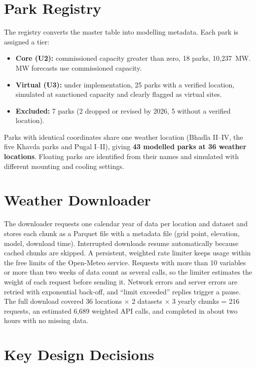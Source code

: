 \documentclass[12pt]{report}
\begin{document}
\section{Park Registry}
\vspace{1mm}
The registry converts the master table into modelling metadata. Each park is assigned a tier:
\begin{itemize}[noitemsep]
    \item \textbf{Core (U2):} commissioned capacity greater than zero, 18 parks, 10,237~MW. MW forecasts use commissioned capacity.
    \item \textbf{Virtual (U3):} under implementation, 25 parks with a verified location, simulated at sanctioned capacity and clearly flagged as virtual sites.
    \item \textbf{Excluded:} 7 parks (2 dropped or revised by 2026, 5 without a verified location).
\end{itemize}
Parks with identical coordinates share one weather location (Bhadla II--IV, the five Khavda parks and Pugal I--II), giving \textbf{43 modelled parks at 36 weather locations}. Floating parks are identified from their names and simulated with different mounting and cooling settings.

\section{Weather Downloader}
\vspace{1mm}
The downloader requests one calendar year of data per location and dataset and stores each chunk as a Parquet file with a metadata file (grid point, elevation, model, download time). Interrupted downloads resume automatically because cached chunks are skipped. A persistent, weighted rate limiter keeps usage within the free limits of the Open-Meteo service. Requests with more than 10 variables or more than two weeks of data count as several calls, so the limiter estimates the weight of each request before sending it. Network errors and server errors are retried with exponential back-off, and ``limit exceeded'' replies trigger a pause.\\

The full download covered 36 locations $\times$ 2 datasets $\times$ 3 yearly chunks = 216 requests, an estimated 6,689 weighted API calls, and completed in about two hours with no missing data.

\section{Key Design Decisions}
\vspace{1mm}
\end{document}
